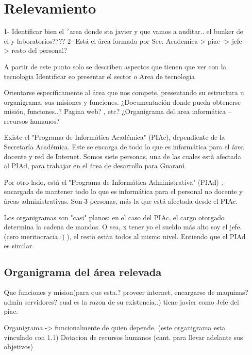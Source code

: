 \documentclass[10pt,a4paper,final]{article}
\begin{document}
\section{Relevamiento}
1- Identificar bien el ´area donde sta javier y que vamos a auditar.. el bunker de el y laboratorios????
2- Está el área formada por Sec. Academica-> piac -> jefe -> resto del personal?

A partir de este punto solo se describen aspectos que tienen que ver con la tecnologia
Identificar eo presentar el sector o Area de tecnologia

Orientarse específicamente al área que nos compete, presentando su estructura u organigrama, sus misiones y funciones.
¿Documentación donde pueda obtenerse misión, funciones..? Pagina web? , etc?
¿Organigrama del area informática – recursos humanos?

Existe el "Programa de Informática Académica" (PIAc), dependiente de la Secretaría Académica. Este se encarga de todo lo que es informática para el área docente y red de Internet. Somos siete personas, una de las cuales está afectada al PIAd, para trabajar en el área de desarrollo para Guaraní.

Por otro lado, está el "Programa de Informática Administrativa" (PIAd) , encargada de mantener todo lo que es informática para el personal no docente y áreas administrativas. Son 3 personas, más la que está afectada desde el PIAc.

Los organigramas son "casi" planos: en el caso del PIAc, el cargo otorgado determina la cadena de mandos. O sea, x tener yo el sueldo más alto soy el jefe.  (cero meritocracia :) ), el resto están todos al mismo nivel. Entiendo que el PIAd es similar.

\subsection{Organigrama del área relevada}
Que funciones y  mision(para que esta.? proveer internet, encargarse de maquinas? admin servidores? cual es la razon de su existencia..) tiene javier como Jefe del piac.

    Organigrama -> funcionalmente de quien depende. (este organigrama esta vinculado con 1.1)
          Dotacion de recursos humanos (cant. para llevar adelante sus objetivos)
\end{document}
